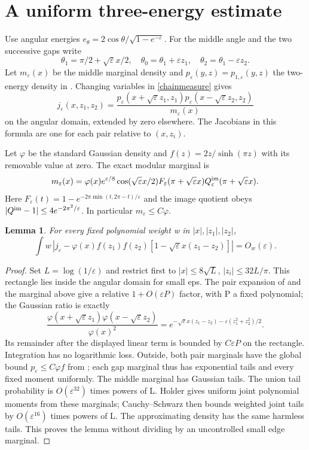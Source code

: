 \documentclass[11pt]{article}
\newcommand{\eps}{\varepsilon}
\newtheorem{lemma}{Lemma}
\begin{document}
\newpage
\section{A uniform three-energy estimate}
Use angular energies $e_\theta=2\cos\theta/\sqrt{1-e^{-\eps}}$.
For the middle angle and the two successive gaps write
\[
 \theta_1=\pi/2+\sqrt\eps x/2,\quad
 \theta_0=\theta_1+\eps z_1,\quad
 \theta_2=\theta_1-\eps z_2.
\]
Let $m_\eps(x)$ be the middle marginal density and
$p_\eps(y,z)=p_{1,\eps}(y,z)$ the two-energy density in
\cite{weighted}. Changing variables in \eqref{chainmeasure} gives
\begin{equation}\label{density3}
 j_\eps(x,z_1,z_2)=
 \frac{p_\eps(x+\sqrt\eps z_1,z_1)
       p_\eps(x-\sqrt\eps z_2,z_2)}{m_\eps(x)}
\end{equation}
on the angular domain, extended by zero elsewhere. The Jacobians
in this formula are one for each pair relative to $(x,z_i)$.

Let $\varphi$ be the standard Gaussian density and
$f(z)=2z/\sinh(\pi z)$ with its removable value at zero.
The exact modular marginal is
\[
 m_\eps(x)=\varphi(x)e^{\eps/8}\cos(\sqrt\eps x/2)
 F_\eps(\pi+\sqrt\eps x)Q_\eps^{\rm im}(\pi+\sqrt\eps x).
\]
Here $F_\eps(t)=1-e^{-2\pi\min(t,2\pi-t)/\eps}$ and the image
quotient obeys $|Q^{\rm im}-1|\le4e^{-2\pi^2/\eps}$.
In particular $m_\eps\le C\varphi$.

\begin{lemma}\label{L1}
For every fixed polynomial weight w in $|x|,|z_1|,|z_2|$,
\[
 \int w\,\left|j_\eps-\varphi(x)f(z_1)f(z_2)
       [1-\sqrt\eps x(z_1-z_2)]\right|=O_w(\eps).
\]
\end{lemma}
\begin{proof}
Set $L=\log(1/\eps)$ and restrict first to
$|x|\le8\sqrt L$, $|z_i|\le32L/\pi$. This rectangle lies inside
the angular domain for small eps. The pair expansion of
\cite{weighted} and the marginal above give a relative
$1+O(\eps P)$ factor, with P a fixed polynomial; the Gaussian
ratio is exactly
\[
 \frac{\varphi(x+\sqrt\eps z_1)\varphi(x-\sqrt\eps z_2)}
      {\varphi(x)^2}
 =e^{-\sqrt\eps x(z_1-z_2)-\eps(z_1^2+z_2^2)/2}.
\]
Its remainder after the displayed linear term is bounded by
$C\eps P$ on the rectangle. Integration has no logarithmic loss.
Outside, both pair marginals have the global bound
$p_\eps\le C\varphi f$ from \cite{weighted}; each gap marginal
thus has exponential tails and every fixed moment uniformly.
The middle marginal has Gaussian tails. The union tail probability
is $O(\eps^{32})$ times powers of L. Holder gives uniform joint
polynomial moments from these marginals; Cauchy--Schwarz then
bounds weighted joint tails by $O(\eps^{16})$ times powers of L.
The approximating density has the same harmless tails.
This proves the lemma without dividing by an uncontrolled
small edge marginal.
\end{proof}
\end{document}
